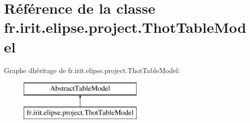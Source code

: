 \hypertarget{classfr_1_1irit_1_1elipse_1_1project_1_1_thot_table_model}{}\section{Référence de la classe fr.\+irit.\+elipse.\+project.\+Thot\+Table\+Model}
\label{classfr_1_1irit_1_1elipse_1_1project_1_1_thot_table_model}
Graphe d\textquotesingle{}héritage de fr.\+irit.\+elipse.\+project.\+Thot\+Table\+Model\+:\begin{figure}[H]
\begin{center}
\leavevmode
\includegraphics[height=2.000000cm]{classfr_1_1irit_1_1elipse_1_1project_1_1_thot_table_model}
\end{center}
\end{figure}
